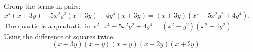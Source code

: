 Group the terms in pairs:
\[
x^4(x+3y)-5x^2y^2(x+3y)+4y^4(x+3y)=(x+3y)\left(x^4-5x^2y^2+4y^4\right).
\]
The quartic is a quadratic in $x^2$: $x^4-5x^2y^2+4y^4=(x^2-y^2)(x^2-4y^2)$. Using the difference of squares twice,
\[
\boxed{(x+3y)(x-y)(x+y)(x-2y)(x+2y)}.
\]
